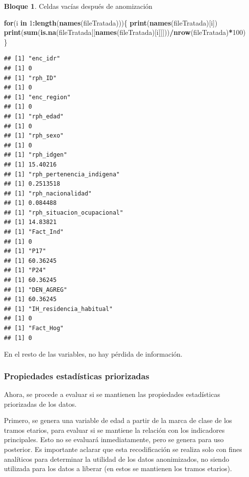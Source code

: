 \documentclass[]{book}
\newenvironment{Shaded}{\begin{snugshade}}{\end{snugshade}}
\newcommand{\ControlFlowTok}[1]{\textcolor[rgb]{0.13,0.29,0.53}{\textbf{#1}}}
\newcommand{\DecValTok}[1]{\textcolor[rgb]{0.00,0.00,0.81}{#1}}
\newcommand{\KeywordTok}[1]{\textcolor[rgb]{0.13,0.29,0.53}{\textbf{#1}}}
\newcommand{\NormalTok}[1]{#1}
\newcommand{\OperatorTok}[1]{\textcolor[rgb]{0.81,0.36,0.00}{\textbf{#1}}}
\theoremstyle{definition}
\theoremstyle{definition}
\newtheorem{example}{Bloque}[chapter]
\theoremstyle{definition}
\theoremstyle{definition}
\theoremstyle{remark}
\begin{document}
\begin{example}
\protect\hypertarget{exm:bloque72nbm}{}{\label{exm:bloque72nbm} }Celdas vacías después de anomización
\end{example}

\begin{Shaded}
\begin{Highlighting}[]
\ControlFlowTok{for}\NormalTok{(i }\ControlFlowTok{in} \DecValTok{1}\OperatorTok{:}\KeywordTok{length}\NormalTok{(}\KeywordTok{names}\NormalTok{(fileTratada)))\{}
  \KeywordTok{print}\NormalTok{(}\KeywordTok{names}\NormalTok{(fileTratada)[i])}
  \KeywordTok{print}\NormalTok{(}\KeywordTok{sum}\NormalTok{(}\KeywordTok{is.na}\NormalTok{(fileTratada[[}\KeywordTok{names}\NormalTok{(fileTratada)[i]]]))}\OperatorTok{/}\KeywordTok{nrow}\NormalTok{(fileTratada)}\OperatorTok{*}\DecValTok{100}\NormalTok{)}
\NormalTok{\}}
\end{Highlighting}
\end{Shaded}

\begin{verbatim}
## [1] "enc_idr"
## [1] 0
## [1] "rph_ID"
## [1] 0
## [1] "enc_region"
## [1] 0
## [1] "rph_edad"
## [1] 0
## [1] "rph_sexo"
## [1] 0
## [1] "rph_idgen"
## [1] 15.40216
## [1] "rph_pertenencia_indigena"
## [1] 0.2513518
## [1] "rph_nacionalidad"
## [1] 0.084488
## [1] "rph_situacion_ocupacional"
## [1] 14.83821
## [1] "Fact_Ind"
## [1] 0
## [1] "P17"
## [1] 60.36245
## [1] "P24"
## [1] 60.36245
## [1] "DEN_AGREG"
## [1] 60.36245
## [1] "IH_residencia_habitual"
## [1] 0
## [1] "Fact_Hog"
## [1] 0
\end{verbatim}

En el resto de las variables, no hay pérdida de información.

\hypertarget{propiedades-estaduxedsticas-priorizadas}{%
\subsubsection{Propiedades estadísticas priorizadas}\label{propiedades-estaduxedsticas-priorizadas}}

Ahora, se procede a evaluar si se mantienen las propiedades estadísticas priorizadas de los datos.

Primero, se genera una variable de edad a partir de la marca de clase de los tramos etarios, para evaluar si se mantiene la relación con los indicadores principales. Esto no se evaluará inmediatamente, pero se genera para uso posterior. Es importante aclarar que esta recodificación se realiza solo con fines analíticos para determinar la utilidad de los datos anonimizados, no siendo utilizada para los datos a liberar (en estos se mantienen los tramos etarios).
\end{document}
